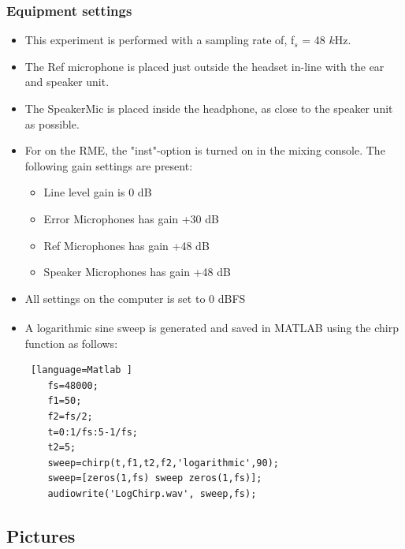\subsubsection{Equipment settings}
\begin{itemize}
	\item This experiment is performed with a sampling rate of, f$_{s}$ = 48 $k$Hz.
	\item The Ref microphone is placed just outside the headset in-line with the ear and speaker unit. 
	\item The SpeakerMic is placed inside the headphone, as close to the speaker unit as possible. 
	\item For on the RME, the "inst"-option is turned on in the mixing console. The following gain settings are present: 		
	\begin{itemize}
		\item Line level gain is 0 dB
		\item Error Microphones has gain +30 dB
		\item Ref Microphones has gain +48 dB
		\item Speaker Microphones has gain +48 dB
	\end{itemize}
	\item All settings on the computer is set to 0 dBFS
	\item A logarithmic sine sweep is generated and saved in MATLAB\textsuperscript{\textregistered} using the chirp function as follows:
	\begin{lstlisting} [language=Matlab	]
	fs=48000;
	f1=50;
	f2=fs/2;
	t=0:1/fs:5-1/fs;
	t2=5;
	sweep=chirp(t,f1,t2,f2,'logarithmic',90);
	sweep=[zeros(1,fs) sweep zeros(1,fs)];
	audiowrite('LogChirp.wav', sweep,fs);
	\end{lstlisting}
\end{itemize} 
 
\subsection{Pictures}

